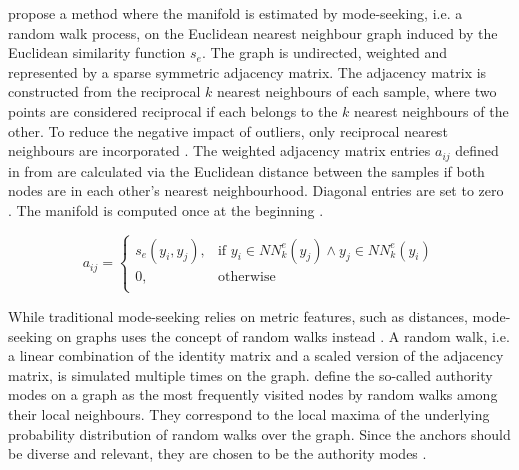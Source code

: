 \citet{mining_manifolds_2018} propose a method where the manifold is estimated by mode-seeking, i.e. a random walk process, 
on the Euclidean nearest neighbour graph induced by the Euclidean similarity function $s_e$.
The graph is undirected, weighted and represented by a sparse symmetric adjacency matrix.
The adjacency matrix is constructed from the reciprocal $k$ nearest neighbours of each sample, 
where two points are considered reciprocal if each belongs to the $k$ nearest neighbours of the other. 
To reduce the negative impact of outliers, only reciprocal nearest neighbours are incorporated \citep{diffusion_2017,mining_manifolds_2018,fast_2018}.
The weighted adjacency matrix entries $a_{ij}$ defined in  from \citet{mining_manifolds_2018} 
are calculated via the Euclidean distance between the samples if both nodes are in each other's nearest neighbourhood.
Diagonal entries are set to zero \citep{mining_manifolds_2018,fast_2018}.
The manifold is computed once at the beginning \citep{mining_manifolds_2018}.

\begin{equation}
    a_{ij} = \begin{cases}
        s_e(y_i,y_j), & \text{if } y_i \in NN^e_k(y_j)\wedge y_j \in NN^e_k(y_i)\\
        0, & \text{otherwise}\\
      \end{cases}     
    \label{eq:mining_manifolds_adjacency_matrix}
\end{equation}



While traditional mode-seeking relies on metric features, such as distances, mode-seeking on graphs 
uses the concept of random walks instead \citep{mode_seeking_2012}.
A random walk, i.e. a linear combination of the identity matrix and a scaled version of the adjacency matrix, is simulated multiple times on the graph.
\citet{mode_seeking_2012} define the so-called authority modes on a graph 
as the most frequently visited nodes by random walks among their local neighbours.
They correspond to the local maxima of the underlying probability distribution of random walks over the graph.
Since the anchors should be diverse and relevant, they are chosen to be the authority modes \citep{mining_manifolds_2018}.

